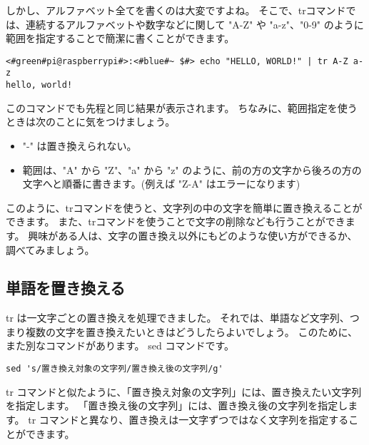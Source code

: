 しかし、アルファベット全てを書くのは大変ですよね。
そこで、trコマンドでは、連続するアルファベットや数字などに関して "A-Z" や "a-z"、"0-9"
のように範囲を指定することで簡潔に書くことができます。

\begin{lstlisting}[caption=範囲指定を使った置き換え, label=tr_range]
<#green#pi@raspberrypi#>:<#blue#~ $#> echo "HELLO, WORLD!" | tr A-Z a-z
hello, world!
\end{lstlisting}

このコマンドでも先程と同じ結果が表示されます。
ちなみに、範囲指定を使うときは次のことに気をつけましょう。
\begin{itemize}
    \item "-" は置き換えられない。
    \item 範囲は、"A" から "Z"、"a" から "z" のように、前の方の文字から後ろの方の文字へと順番に書きます。(例えば "Z-A"
          はエラーになります)
\end{itemize}

このように、trコマンドを使うと、文字列の中の文字を簡単に置き換えることができます。
また、trコマンドを使うことで文字の削除なども行うことができます。
興味がある人は、文字の置き換え以外にもどのような使い方ができるか、調べてみましょう。

\begin{tcolorbox}[title=\useOmetoi]
    \begin{enumerate}
    \end{enumerate}
\end{tcolorbox}

\subsection{単語を置き換える}
tr は一文字ごとの置き換えを処理できました。
それでは、単語など文字列、つまり複数の文字を置き換えたいときはどうしたらよいでしょう。
このために、また別なコマンドがあります。
sed コマンドです。

\begin{lstlisting}[caption=sed コマンドの基本的な使い方, label=sed_usage]
sed 's/置き換え対象の文字列/置き換え後の文字列/g'
\end{lstlisting}

tr コマンドと似たように、「置き換え対象の文字列」には、置き換えたい文字列を指定します。
「置き換え後の文字列」には、置き換え後の文字列を指定します。
tr コマンドと異なり、置き換えは一文字ずつではなく文字列を指定することができます。

